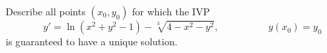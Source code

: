 \begin{applicationActivities}
\begin{activity}{10}
Describe all points \((x_0,y_0)\) for which the IVP
\[ y'= \ln(x^2+y^2-1) - \sqrt[3]{4-x^2-y^2}, \hspace{5em} y(x_0)=y_0\]
is guaranteed to have a unique solution.
\end{activity}


\end{applicationActivities}
